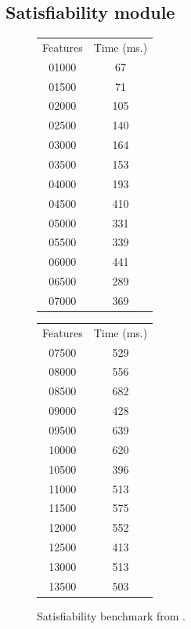 

\subsection{Satisfiability module}
\label{subsection:satifiability:module}
\begin{figure}[t]
	\centering
	\begin{minipage}{0.4\hsize}
		\begin{tabular}{|cc|}
			\hline
			Features&    Time (ms.)\\
			01000 & 67\\
			01500 & 71\\
			02000 & 105\\
			02500 & 140\\
			03000 & 164\\
			03500 & 153\\
			04000 & 193\\
			04500 & 410\\
			05000 & 331\\
			05500 & 339\\
			06000 & 441\\
			06500 & 289\\
			07000 & 369\\
			
			\hline
		\end{tabular}
	\end{minipage}
	\begin{minipage}{0.4\hsize}
		\begin{tabular}{|cc|}
			\hline
			Features&    Time (ms.)\\
			07500 & 529\\
			08000 & 556\\
			08500 & 682\\
			09000 & 428\\
			09500 & 639\\
			10000 & 620\\
			10500 & 396\\
			11000 & 513\\
			11500 & 575\\
			12000 & 552\\
			12500 & 413\\
			13000 & 513\\
			13500 & 503\\
			\hline
		\end{tabular}
	\end{minipage}
	\caption{Satisfiability benchmark from \cite{acl13}.\label{figure:tool:sat:benchmakr}}
\end{figure}

